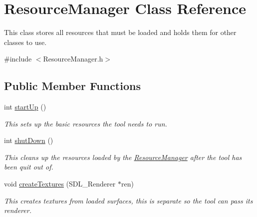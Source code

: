 \hypertarget{class_resource_manager}{}\section{Resource\+Manager Class Reference}
\label{class_resource_manager}


This class stores all resources that must be loaded and holds them for other classes to use.  




{\ttfamily \#include $<$Resource\+Manager.\+h$>$}

\subsection*{Public Member Functions}
\begin{DoxyCompactItemize}
\item 
\mbox{\label{class_resource_manager_a53bf358b029e050a285725bc70a8550a}} 
int \mbox{\hyperlink{class_resource_manager_a53bf358b029e050a285725bc70a8550a}{start\+Up}} ()
\begin{DoxyCompactList}\small\item\em This sets up the basic resources the tool needs to run. \end{DoxyCompactList}\item 
\mbox{\label{class_resource_manager_ab8d9779f5f957610d272525cc32a775e}} 
int \mbox{\hyperlink{class_resource_manager_ab8d9779f5f957610d272525cc32a775e}{shut\+Down}} ()
\begin{DoxyCompactList}\small\item\em This cleans up the resources loaded by the \mbox{\hyperlink{class_resource_manager}{Resource\+Manager}} after the tool has been quit out of. \end{DoxyCompactList}\item 
\mbox{\label{class_resource_manager_ad1cad583428596c69f9190acb291b02a}} 
void \mbox{\hyperlink{class_resource_manager_ad1cad583428596c69f9190acb291b02a}{create\+Textures}} (S\+D\+L\+\_\+\+Renderer $\ast$ren)
\begin{DoxyCompactList}\small\item\em This creates textures from loaded surfaces, this is separate so the tool can pass its renderer. \end{DoxyCompactList}\end{DoxyCompactItemize}

